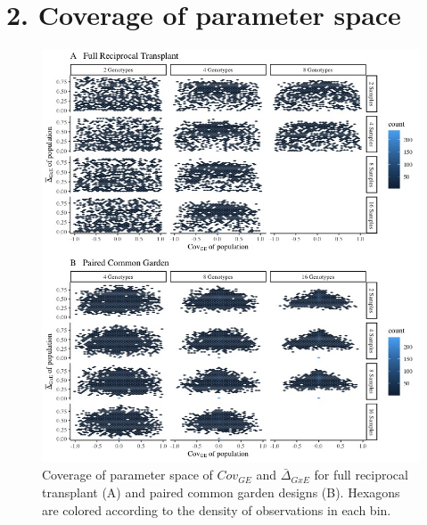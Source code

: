 \documentclass[11pt, oneside]{amsart}
\begin{document}
\section{2. Coverage of parameter space}
\renewcommand\thefigure{S2}
\begin{figure}[h]
\begin{center}
\includegraphics[width=6in]{Figs/HexPlot.jpeg}
\end{center}
\label{Fig: Parameter Coverage}
\caption[Coverage of parameter space of $Cov_{GE}$ and $\bar\Delta_{GxE}$ for full reciprocal transplant (A) and paired common garden designs (B).]{Coverage of parameter space of $Cov_{GE}$ and $\bar\Delta_{GxE}$ for full reciprocal transplant (A) and paired common garden designs (B). Hexagons are colored according to the density of observations in each bin. }
\end{figure}

\clearpage
\newpage

\renewcommand{\figurename}{Supplementary Figure}
\end{document}
